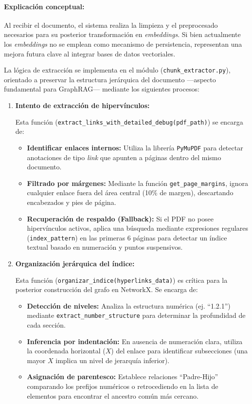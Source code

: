 \paragraph{Explicación conceptual:}
Al recibir el documento, el sistema realiza la limpieza y el preprocesado necesarios para su posterior transformación en \textit{embeddings}. Si bien actualmente los \textit{embeddings} no se emplean como mecanismo de persistencia, representan una mejora futura clave al integrar bases de datos vectoriales.

La lógica de extracción se implementa en el módulo (\texttt{chunk\_extractor.py}), orientado a preservar la estructura jerárquica del documento —aspecto fundamental para GraphRAG— mediante los siguientes procesos:

\begin{enumerate}
    \item \textbf{Intento de extracción de hipervínculos:}

    Esta función (\texttt{extract\_links\_with\_detailed\_debug(pdf\_path)}) se encarga de:
    \begin{itemize}
        \item \textbf{Identificar enlaces internos:} Utiliza la librería \texttt{PyMuPDF} para detectar anotaciones de tipo \textit{link} que apunten a páginas dentro del mismo documento.
        \item \textbf{Filtrado por márgenes:} Mediante la función \texttt{get\_page\_margins}, ignora cualquier enlace fuera del área central (10\% de margen), descartando encabezados y pies de página.
        \item \textbf{Recuperación de respaldo (Fallback):} Si el PDF no posee hipervínculos activos, aplica una búsqueda mediante expresiones regulares (\texttt{index\_pattern}) en las primeras 6 páginas para detectar un índice textual basado en numeración y puntos suspensivos.
    \end{itemize}

    \item \textbf{Organización jerárquica del índice:}

    Esta función (\texttt{organizar\_indice(hyperlinks\_data)}) es crítica para la posterior construcción del grafo en NetworkX. Se encarga de:
    \begin{itemize}
        \item \textbf{Detección de niveles:} Analiza la estructura numérica (ej. ``1.2.1'') mediante \texttt{extract\_\allowbreak number\_struc\-ture} para determinar la profundidad de cada sección.
        \item \textbf{Inferencia por indentación:} En ausencia de numeración clara, utiliza la coordenada horizontal ($X$) del enlace para identificar subsecciones (una mayor $X$ implica un nivel de jerarquía inferior).
        \item \textbf{Asignación de parentesco:} Establece relaciones ``Padre-Hijo'' comparando los prefijos numéricos o retrocediendo en la lista de elementos para encontrar el ancestro común más cercano.
    \end{itemize}


\end{enumerate}
